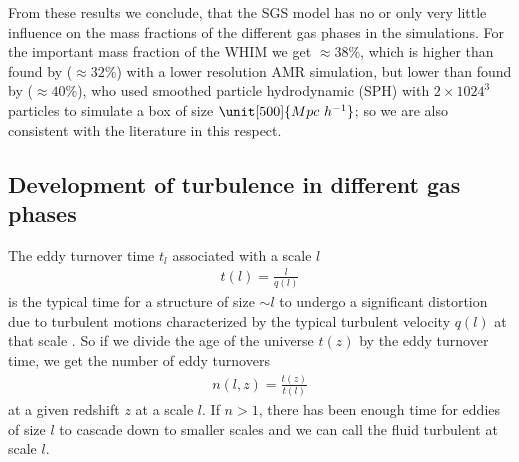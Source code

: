 From these results we conclude, that the SGS model has no or only very little
influence on the mass fractions of the different gas phases in the simulations.
For the important mass fraction of the WHIM we get $ \approx 38\%$, which is 
higher than found by \citet[simulation B1]{Dave2001} ($ \approx 32\%$) with a
lower resolution AMR simulation, but lower than found by \citet{Gottlober2006}
($ \approx 40\%$), who used smoothed particle hydrodynamic (SPH) with 
$2 \times 1024^3$ particles to simulate a box of size $\unit[500]{Mpc\ h^{-1}}$;
so we are also consistent with the literature in this respect.

\subsection{Development of turbulence in different gas phases}
The eddy turnover time $t_l$ associated with a scale $l$ 
\begin{align}
t(l) = \frac{l}{q(l)}
\end{align}
is the typical time for a structure of size $\sim l$ to undergo a significant
distortion due to turbulent motions characterized by the
typical turbulent velocity $q(l)$ at that scale \citep{Frisch1995}. So if we
divide the age of the universe $t(z)$ by the eddy turnover time, we get the
number of eddy turnovers 
\begin{align}
n(l,z)=\frac{t(z)}{t(l)}
\end{align}
at a given redshift $z$ at a scale $l$. If $n > 1$, there has been enough time 
for eddies of size $l$ to cascade down to smaller scales and we can call the
fluid turbulent at scale $l$. 

